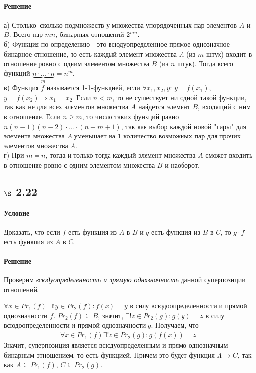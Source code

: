 \documentclass[a4paper,12pt]{article}
\begin{document}
\paragraph*{Решение}
а) Столько, сколько подмножеств у множества упорядоченных пар элементов $A$ и $B$. Всего пар $mn$,  бинарных отношений $2^{mn}$. \\
б) Функция по определению - это всюдуопределенное прямое однозначное бинарное отношение, то есть каждый элемент множества $A$ (из $m$ штук) входит в отношение ровно с одним элементом множества $B$ (из $n$ штук). Тогда всего функций $\underbrace{n\cdot \ldots \cdot n}_m = n^m$. \\
в) Функция $f$ называется 1-1-функцией, если $\forall x_1,x_2,y$: $y=f(x_1)$, $y=f(x_2)\Rightarrow x_1=x_2$. Если $n<m$, то не существует ни одной такой функции, так как не для всех элементов множества $A$ найдется элемент $B$, входящий с ним в отношение. Если $n\geqslant m$, то число таких функций равно $n(n-1)(n-2)\cdot \ldots \cdot (n-m+1)$, так как выбор каждой новой "пары" для элемента множества $A$ уменьшает на $1$ количество возможных пар для прочих элементов множества $A$.\\
г) При $m=n$, тогда и только тогда каждый элемент множества $A$ сможет входить в отношение ровно с одним элементом множества $B$ и наоборот.

\subsection*{$\S$ 2.22}
\paragraph*{Условие}
Доказать, что если $f$ есть функция из $A$ в $B$ и $g$ есть функция из $B$ в $C$, то $g\cdot f$ есть функция из $A$ в $C$.
\paragraph*{Решение}
Проверим \textit{всюдуопределенность и прямую однозначность} данной суперпозиции отношений. \par
$\forall x\in Pr_1(f)$ $\exists ! y\in Pr_2(f): f(x)=y$ в силу всюдоопределенности и прямой однозначности $f$. $Pr_2(f) \subseteq B$, значит, $\exists ! z\in Pr_2(g): g(y)=z$ в силу всюдоопределенности и прямой однозначности $g$. Получаем, что
\begin{gather*}
\forall x \in Pr_1(f) \exists ! z\in Pr_2(g): g(f(x))=z
\end{gather*}
Значит, суперпозиция является всюдуопределенным и прямо однозначным бинарным отношением, то есть функцией. Причем это будет функция $A\to C$, так как $A\subseteq Pr_1(f)$, $C\subseteq Pr_2(g)$. \par
\end{document}
